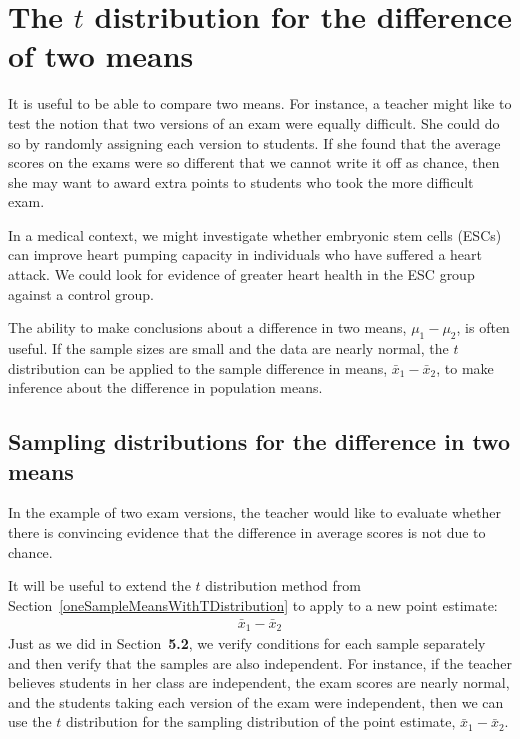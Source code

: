\section{The $t$ distribution for the difference of two means}

It is useful to be able to compare two means. For instance, a teacher might like to test the notion that two versions of an exam were equally difficult. She could do so by randomly assigning each version to students. If she found that the average scores on the exams were so different that we cannot write it off as chance, then she may want to award extra points to students who took the more difficult exam.

In a medical context, we might investigate whether embryonic stem cells (ESCs) can improve heart pumping capacity in individuals who have suffered a heart attack. We could look for evidence of greater heart health in the ESC group against a control group.

The ability to make conclusions about a difference in two means, $\mu_1 - \mu_2$, is often useful. If the sample sizes are small and the data are nearly normal, the $t$ distribution can be applied to the sample difference in means, $\bar{x}_1 - \bar{x}_2$, to make inference about the difference in population means.

\subsection{Sampling distributions for the difference in two means}

In the example of two exam versions, the teacher would like to evaluate whether there is convincing evidence that the difference in average scores is not due to chance.

It will be useful to extend the $t$ distribution method from Section~\ref{oneSampleMeansWithTDistribution} to apply to a new point estimate:
\begin{eqnarray*}
\bar{x}_1 - \bar{x}_2
\end{eqnarray*}
Just as we did in Section~\textbf{\color{red}5.2}, we verify conditions for each sample separately and then verify that the samples are also independent. For instance, if the teacher believes students in her class are independent, the exam scores are nearly normal, and the students taking each version of the exam were independent, then we can use the $t$ distribution for the sampling distribution of the point estimate, $\bar{x}_{1} - \bar{x}_{2}$.

